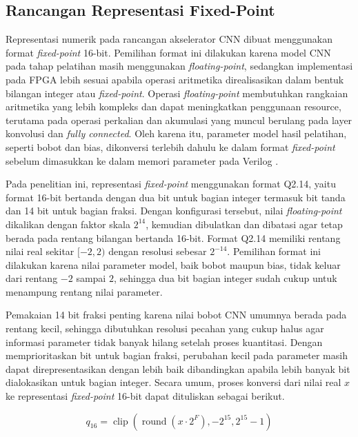     \subsection{Rancangan Representasi Fixed-Point}
	Representasi numerik pada rancangan akselerator CNN dibuat menggunakan format
	\emph{fixed-point} 16-bit. Pemilihan format ini dilakukan karena model CNN pada
	tahap pelatihan masih menggunakan \emph{floating-point}, sedangkan implementasi
	pada FPGA lebih sesuai apabila operasi aritmetika direalisasikan dalam bentuk
	bilangan integer atau \emph{fixed-point}. Operasi \emph{floating-point} membutuhkan
	rangkaian aritmetika yang lebih kompleks dan dapat meningkatkan penggunaan
	resource, terutama pada operasi perkalian dan akumulasi yang muncul berulang pada
	layer konvolusi dan \emph{fully connected}. Oleh karena itu, parameter model hasil
	pelatihan, seperti bobot dan bias, dikonversi terlebih dahulu ke dalam format
	\emph{fixed-point} sebelum dimasukkan ke dalam memori parameter pada Verilog
	\cite{Zhang2015OptimizingCNNFPGA,Solovyev2019FixedPointCNN}.

	Pada penelitian ini, representasi \emph{fixed-point} menggunakan format Q2.14,
	yaitu format 16-bit bertanda dengan dua bit untuk bagian integer termasuk bit
	tanda dan 14 bit untuk bagian fraksi. Dengan konfigurasi tersebut, nilai
	\emph{floating-point} dikalikan dengan faktor skala $2^{14}$, kemudian dibulatkan
	dan dibatasi agar tetap berada pada rentang bilangan bertanda 16-bit. Format
	Q2.14 memiliki rentang nilai real sekitar $[-2, 2)$ dengan resolusi sebesar
	$2^{-14}$. Pemilihan format ini dilakukan karena nilai parameter model, baik
	bobot maupun bias, tidak keluar dari rentang $-2$ sampai $2$, sehingga dua bit
	bagian integer sudah cukup untuk menampung rentang nilai parameter.

	Pemakaian 14 bit fraksi penting karena nilai bobot CNN umumnya berada pada
	rentang kecil, sehingga dibutuhkan resolusi pecahan yang cukup halus agar
	informasi parameter tidak banyak hilang setelah proses kuantitasi. Dengan
	memprioritaskan bit untuk bagian fraksi, perubahan kecil pada parameter masih
	dapat direpresentasikan dengan lebih baik dibandingkan apabila lebih banyak
	bit dialokasikan untuk bagian integer. Secara umum, proses konversi dari nilai
	real $x$ ke representasi \emph{fixed-point} 16-bit dapat dituliskan sebagai
	berikut.

	\begin{equation}
	q_{16} =
	\operatorname{clip}
	\left(
	\operatorname{round}(x \cdot 2^F),
	-2^{15},
	2^{15}-1
	\right)
	\label{eq:fixed-point-1}
	\end{equation}

